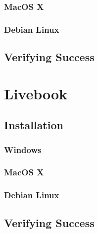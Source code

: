 \subsubsection{MacOS X}
\subsubsection{Debian Linux}
\subsection{Verifying Success}

\section{Livebook}

\subsection{Installation}
\subsubsection{Windows}
\subsubsection{MacOS X}
\subsubsection{Debian Linux}
\subsection{Verifying Success}
